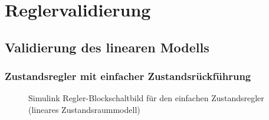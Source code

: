 \section{Reglervalidierung} \label{sec:Reglervalidierung}

\subsection{Validierung des linearen Modells} \label{sec:Vergleich_linear}

\subsubsection{Zustandsregler mit einfacher Zustandsrückführung}

\begin{figure}[H]
    \centering
    \caption[Einfacher Zustandsregler Simulink (linear)]{Simulink Regler-Blockschaltbild für den einfachen Zustandsregler (lineares Zustandsraummodell)}
    \label{fig:Bild13}
\end{figure}

